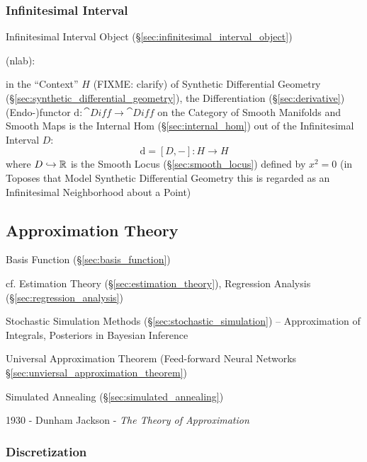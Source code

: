 {\subsubsection{Infinitesimal Interval}\label{sec:infinitesimal_interval}

\fist Infinitesimal Interval Object (\S\ref{sec:infinitesimal_interval_object})

(nlab):

in the ``Context'' $H$ (FIXME: clarify) of Synthetic Differential Geometry
(\S\ref{sec:synthetic_differential_geometry}), the Differentiation
(\S\ref{sec:derivative}) (Endo-)functor $\mathrm{d} : \cat{Diff} \rightarrow
\cat{Diff}$ on the Category of Smooth Manifolds and Smooth Maps is the Internal
Hom (\S\ref{sec:internal_hom}) out of the Infinitesimal Interval $D$:
\[
  \mathrm{d} = [D,-] : H \rightarrow H
\]
where $D \hookrightarrow \mathbb{R}$ is the Smooth Locus (\S\ref{sec:smooth_locus})
defined by $x^2 = 0$ (in Toposes that Model Synthetic Differential Geometry this
is regarded as an Infinitesimal Neighborhood about a Point)



\subsection{Approximation Theory}\label{sec:approximation_theory}

Basis Function (\S\ref{sec:basis_function})

\fist cf. Estimation Theory (\S\ref{sec:estimation_theory}), Regression Analysis
(\S\ref{sec:regression_analysis})

Stochastic Simulation Methods (\S\ref{sec:stochastic_simulation}) --
Approximation of Integrals, Posteriors in Bayesian Inference

\fist Universal Approximation Theorem (Feed-forward Neural Networks
\S\ref{sec:unviersal_approximation_theorem})

\fist Simulated Annealing (\S\ref{sec:simulated_annealing})

1930 - Dunham Jackson - \emph{The Theory of Approximation}



\subsubsection{Discretization}\label{sec:discretization}

}
